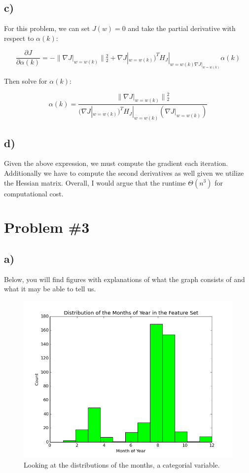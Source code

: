 \documentclass[12pt]{article}
\let\Oldsection\section
\renewcommand{\section}{\FloatBarrier\Oldsection}
\let\Oldsubsection\subsection
\renewcommand{\subsection}{\FloatBarrier\Oldsubsection}
\begin{document}
\subsection*{c)}

For this problem, we can set $J(w) = 0$ and take the partial derivative with respect to $\alpha(k)$:

$$ \frac{\partial J}{\partial \alpha(k)} = 
- \parallel{\nabla J|_{w=w(k)}}\parallel{}_{2}^{2} + \nabla J|_{w=w(k)})^{T}H_J|_{w=w(k) 
\nabla J|_{w=w(k)}} \alpha(k) $$

Then solve for $\alpha(k)$:

$$ \alpha(k) = \frac{\parallel{\nabla J|_{w=w(k)}}\parallel{}_{2}^{2}}
{(\nabla J|_{w=w(k)})^{T} H_J|_{w=w(k)} (\nabla J|_{w=w(k)})} $$

\subsection*{d)}

Given the above expression, we must compute the gradient each iteration. 
Additionally we have to compute the second derivatives as well given we 
utilize the Hessian matrix. Overall, I would argue that the runtime $\Theta(n^3)$
for computational cost.

\section*{Problem \#3}

\subsection*{a)}

Below, you will find figures with explanations of what the graph consists of 
and what it may be able to tell us. 


\begin{figure}[!htb]
\begin{center}
  \includegraphics[scale=0.4]{month-distribution.png}
  \caption{Looking at the distributions of the months, a categorial variable.}
\end{center}
\end{figure}
\end{document}

